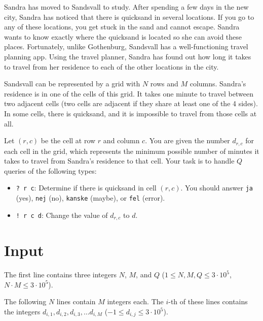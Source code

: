 \noindent


Sandra has moved to Sandsvall to study. After spending a few days in the new city, Sandra has noticed that there is
quicksand in several locations. If you go to any of these locations, you get stuck in the sand and cannot escape.
Sandra wants to know exactly where the quicksand is located so she can avoid these places. Fortunately, unlike
Gothenburg, Sandsvall has a well-functioning travel planning app. Using the travel planner, Sandra has found out
how long it takes to travel from her residence to each of the other locations in the city.

Sandsvall can be represented by a grid with $N$ rows and $M$ columns. Sandra's residence is in one of the cells
of this grid. It takes one minute to travel between two adjacent cells (two cells are adjacent if they share at
least one of the 4 sides). In some cells, there is quicksand, and it is impossible to travel from those cells at all.

Let $(r, c)$ be the cell at row $r$ and column $c$. You are given the number $d_{r,c}$ for each cell in the grid,
which represents the minimum possible number of minutes it takes to travel from Sandra's residence to that cell.
Your task is to handle $Q$ queries of the following types:

\begin{itemize}
    \item \verb|? r c|: Determine if there is quicksand in cell $(r, c)$. You should answer \verb|ja| (yes),
    \verb|nej| (no), \verb|kanske| (maybe), or \verb|fel| (error).
    \item \verb|! r c d|: Change the value of $d_{r, c}$ to $d$.
\end{itemize}

\section*{Input}

The first line contains three integers $N$, $M$, and $Q$
($1 \leq N,M,Q \leq 3 \cdot 10^5$, $N\cdot M \leq 3 \cdot 10^5$).

The following $N$ lines contain $M$ integers each. The $i$-th of these lines contains the integers
$d_{i,1}, d_{i,2}, d_{i,3}, \dots d_{i,M}$ ($-1 \leq d_{i,j} \leq 3 \cdot 10^5$).

